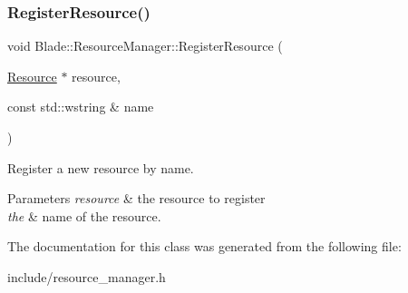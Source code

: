 \subsubsection{\texorpdfstring{Register\+Resource()}{RegisterResource()}}
{\footnotesize\ttfamily void Blade\+::\+Resource\+Manager\+::\+Register\+Resource (\begin{DoxyParamCaption}\item[{\hyperlink{class_blade_1_1_resource}{Resource} $\ast$}]{resource,  }\item[{const std\+::wstring \&}]{name }\end{DoxyParamCaption})\hspace{0.3cm}{\ttfamily [inline]}}



Register a new resource by name. 


\begin{DoxyParams}{Parameters}
{\em resource} & the resource to register \\
\hline
{\em the} & name of the resource. \\
\hline
\end{DoxyParams}


The documentation for this class was generated from the following file\+:\begin{DoxyCompactItemize}
\item 
include/resource\+\_\+manager.\+h\end{DoxyCompactItemize}
